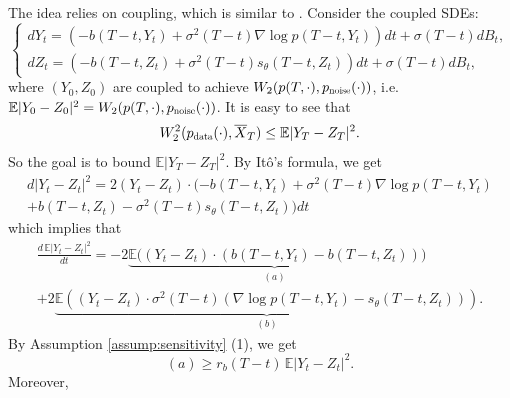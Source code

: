 \documentclass[letterpaper,10pt,reqno]{amsart}
\numberwithin{equation}{section}
\begin{document}
The idea relies on coupling, which is similar to \cite[Lemma 4]{ZTY23}.
Consider the coupled SDEs:
\begin{equation*}
\left\{ \begin{array}{lcl}
d Y_t = \left(-b(T-t, Y_t) + \sigma^2(T-t) \nabla \log p(T-t, Y_t) \right) dt+ \sigma(T-t) dB_t, \\
d Z_t =  \left(-b(T-t, Z_t) + \sigma^2(T-t)s_\theta(T-t, Z_t) \right) dt+ \sigma(T-t) dB_t,
\end{array}\right.
\end{equation*}
where $(Y_0, Z_0)$ are coupled to achieve $W_2(p(T,\cdot), p_{\scalebox{0.7}{noise}}(\cdot))$,
i.e. $\mathbb{E}|Y_0 - Z_0|^2=W_2(p(T,\cdot), p_{\scalebox{0.7}{noise}}(\cdot))$. 
It is easy to see that
\begin{equation}
\label{eq:W2}
W_2^2(p_{\scalebox{0.7}{data}}(\cdot), \overline{X}_T) \le \mathbb{E}|Y_T - Z_T|^2.
\end{equation}
So the goal is to bound $\mathbb{E}|Y_T - Z_T|^2$. 
By It\^o's formula, we get
\begin{multline*}
d|Y_t - Z_t|^2 = 2(Y_t - Z_t) \cdot (-b(T-t, Y_t) + \sigma^2(T-t) \nabla \log p(T-t, Y_t) \\ + b(T-t, Z_t) - \sigma^2(T-t)s_\theta(T-t, Z_t)) dt
\end{multline*}
which implies that 
\begin{multline}
\label{eq:diff}
\frac{d \, \mathbb{E}|Y_t - Z_t|^2}{dt} 
= -2 \underbrace{\mathbb{E}((Y_t - Z_t) \cdot (b(T-t, Y_t) - b(T-t, Z_t))}_{(a)}) \\
+ 2 \underbrace{\mathbb{E}((Y_t - Z_t) \cdot \sigma^2(T-t) (\nabla \log p(T-t, Y_t) - s_\theta(T-t, Z_t)))}_{(b)}.
\end{multline}
By Assumption \ref{assump:sensitivity} (1), we get
\begin{equation}
\label{eq:terma}
(a) \ge r_b(T-t) \, \mathbb{E}|Y_t - Z_t|^2.
\end{equation}
Moreover,
\end{document}

